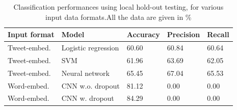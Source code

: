 \begin{table}[h]
  \centering
  \begin{tabular}[c]{lllll}
    Input format&Model&Accuracy&Precision&Recall\\
    \hline
    Tweet-embed.&Logistic regression & 60.60 &    60.84   & 60.64  \\
    Tweet-embed.&SVM             & 61.96    &   63.69     & 62.05   \\
    Tweet-embed.&Neural network & 65.45	& 67.04	& 65.53	 \\
    Word-embed.&CNN w.o. dropout &  81.12  & 0.00	& 0.00	 \\
    Word-embed.&CNN w. dropout & 84.29 & 0.00 & 0.00 
    
  \end{tabular}
  \caption{Classification performances using local hold-out testing, for various input data formats.All the data are given in \%}
  \label{tab:results}
\end{table}


